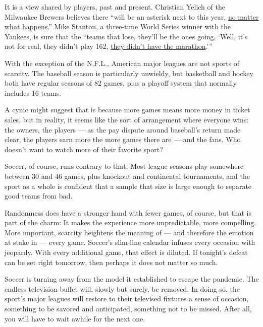 It is a view shared by players, past and present. Christian Yelich of
the Milwaukee Brewers believes there ``will be an asterisk next to this
year,
\href{https://www.usatoday.com/story/sports/mlb/columnist/bob-nightengale/2020/07/22/2020-mlb-season-60-games-crazy-unconventional/5486001002/}{no
matter what happens}.'' Mike Stanton, a three-time World Series winner
with the Yankees, is sure that the ``teams that lose, they'll be the
ones going, `Well, it's not for real, they didn't play 162,
\href{https://www.nytimes3xbfgragh.onion/2020/06/23/sports/baseball/mlb-60-game-season.html\#:~:text=\%E2\%80\%9CThe\%20teams\%20that\%20lose\%2C\%20they,the\%20Yankees\%2C\%20said\%20on\%20Tuesday.}{they
didn't have the marathon}.'''

With the exception of the N.F.L., American major leagues are not sports
of scarcity. The baseball season is particularly unwieldy, but
basketball and hockey both have regular seasons of 82 games, plus a
playoff system that normally includes 16 teams.

A cynic might suggest that is because more games means more money in
ticket sales, but in reality, it seems like the sort of arrangement
where everyone wins: the owners, the players --- as the pay dispute
around baseball's return made clear, the players earn more the more
games there are --- and the fans. Who doesn't want to watch more of
their favorite sport?

Soccer, of course, runs contrary to that. Most league seasons play
somewhere between 30 and 46 games, plus knockout and continental
tournaments, and the sport as a whole is confident that a sample that
size is large enough to separate good teams from bad.

Randomness does have a stronger hand with fewer games, of course, but
that is part of the charm: It makes the experience more unpredictable,
more compelling. More important, scarcity heightens the meaning of ---
and therefore the emotion at stake in --- every game. Soccer's slim-line
calendar infuses every occasion with jeopardy. With every additional
game, that effect is diluted. If tonight's defeat can be set right
tomorrow, then perhaps it does not matter so much.

Soccer is turning away from the model it established to escape the
pandemic. The endless television buffet will, slowly but surely, be
removed. In doing so, the sport's major leagues will restore to their
televised fixtures a sense of occasion, something to be savored and
anticipated, something not to be missed. After all, you will have to
wait awhile for the next one.

